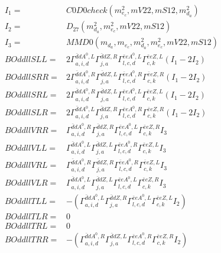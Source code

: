 \documentclass[A4,landscape]{article}
\begin{document}
\begin{align} 
I_1 = & C0D0check(m^2_{e_{{c}}}, mV22, mS12, m^2_{d_{{a}}}) \\ 
I_2 = & D_{27}(m^2_{d_{{a}}}, m^2_{e_{{c}}}, mV22, mS12) \\ 
I_3 = & MMD0(m_{d_{{a}}}, m_{e_{{c}}}, m^2_{d_{{a}}}, m^2_{e_{{c}}}, mV22, mS12) \\ 
  BOddllSLL= & 2  \Gamma^{\bar{d}d A^0 ,L}_{a, i, d} \Gamma^{\bar{d}d Z ,R}_{j, a} \Gamma^{\bar{e}e A^0 ,L}_{l, c, d} \Gamma^{\bar{e}e Z ,L}_{c, k} (I_1 - 2 I_2) \\ 
  BOddllSRR= & 2  \Gamma^{\bar{d}d A^0 ,R}_{a, i, d} \Gamma^{\bar{d}d Z ,L}_{j, a} \Gamma^{\bar{e}e A^0 ,R}_{l, c, d} \Gamma^{\bar{e}e Z ,R}_{c, k} (I_1 - 2 I_2) \\ 
  BOddllSRL= & 2  \Gamma^{\bar{d}d A^0 ,R}_{a, i, d} \Gamma^{\bar{d}d Z ,L}_{j, a} \Gamma^{\bar{e}e A^0 ,L}_{l, c, d} \Gamma^{\bar{e}e Z ,L}_{c, k} (I_1 - 2 I_2) \\ 
  BOddllSLR= & 2  \Gamma^{\bar{d}d A^0 ,L}_{a, i, d} \Gamma^{\bar{d}d Z ,R}_{j, a} \Gamma^{\bar{e}e A^0 ,R}_{l, c, d} \Gamma^{\bar{e}e Z ,R}_{c, k} (I_1 - 2 I_2) \\ 
  BOddllVRR= &  \Gamma^{\bar{d}d A^0 ,R}_{a, i, d} \Gamma^{\bar{d}d Z ,R}_{j, a} \Gamma^{\bar{e}e A^0 ,L}_{l, c, d} \Gamma^{\bar{e}e Z ,R}_{c, k} I_3 \\ 
  BOddllVLL= &  \Gamma^{\bar{d}d A^0 ,L}_{a, i, d} \Gamma^{\bar{d}d Z ,L}_{j, a} \Gamma^{\bar{e}e A^0 ,R}_{l, c, d} \Gamma^{\bar{e}e Z ,L}_{c, k} I_3 \\ 
  BOddllVRL= &  \Gamma^{\bar{d}d A^0 ,R}_{a, i, d} \Gamma^{\bar{d}d Z ,R}_{j, a} \Gamma^{\bar{e}e A^0 ,R}_{l, c, d} \Gamma^{\bar{e}e Z ,L}_{c, k} I_3 \\ 
  BOddllVLR= &  \Gamma^{\bar{d}d A^0 ,L}_{a, i, d} \Gamma^{\bar{d}d Z ,L}_{j, a} \Gamma^{\bar{e}e A^0 ,L}_{l, c, d} \Gamma^{\bar{e}e Z ,R}_{c, k} I_3 \\ 
  BOddllTLL= & -( \Gamma^{\bar{d}d A^0 ,L}_{a, i, d} \Gamma^{\bar{d}d Z ,R}_{j, a} \Gamma^{\bar{e}e A^0 ,L}_{l, c, d} \Gamma^{\bar{e}e Z ,L}_{c, k} I_2) \\ 
  BOddllTLR= & 0 \\ 
  BOddllTRL= & 0 \\ 
  BOddllTRR= & -( \Gamma^{\bar{d}d A^0 ,R}_{a, i, d} \Gamma^{\bar{d}d Z ,L}_{j, a} \Gamma^{\bar{e}e A^0 ,R}_{l, c, d} \Gamma^{\bar{e}e Z ,R}_{c, k} I_2) \\ 
\end{align} 
\end{document}
